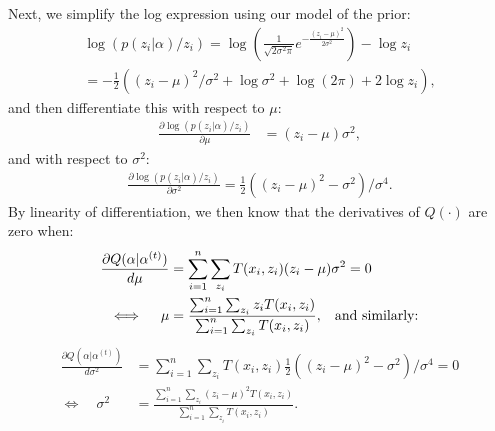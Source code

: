 \documentclass[10pt,letterpaper]{article}
\begin{document}
Next, we simplify the log expression using our model of the prior:  %
\begin{equation}
\begin{aligned}
\log \left( p(z_i | \alpha) / z_i \right) = \log \left( \frac{1}{\sqrt{2\sigma^2 \pi}} e^{-\frac{(z_i - \mu)^2}{2\sigma^2}} \right) - \log z_i \\
= -\frac{1}{2} \left( (z_i - \mu)^2 / \sigma^2 + \log \sigma^2 + \log \left( 2\pi \right) + 2 \log z_i \right) ,
\end{aligned}
\end{equation}
and then differentiate this with respect to $\mu$:
\begin{equation}
\begin{aligned}
\frac{\partial \log \left( p(z_i | \alpha) / z_i \right)}{\partial \mu} &= (z_i - \mu)\sigma^2 ,
\end{aligned}
\end{equation}
and with respect to $\sigma^2$:
\begin{equation}
\begin{aligned}
\frac{\partial \log \left( p(z_i | \alpha) / z_i \right)}{\partial \sigma^2} %
= \frac{1}{2}\left((z_i - \mu)^2 - \sigma^2 \right)/\sigma^4 .
\end{aligned}
\end{equation}
By linearity of differentiation, we then know that the derivatives of $Q(\cdot)$ are zero when:
\begin{equation}
\begin{aligned}
\frac{\partial Q(\alpha | \alpha^{(t)})}{d \mu} &= \sum_{i=1}^n \sum_{z_i} T(x_i, z_i) (z_i - \mu)\sigma^2 = 0  \\
\iff \quad \mu &= \frac{\sum_{i=1}^n \sum_{z_i} z_i T(x_i, z_i)}{\sum_{i=1}^n \sum_{z_i} T(x_i, z_i)} ,  \hspace{0.3cm}\text{and similarly:}
\end{aligned}
\end{equation}
\begin{equation}
\begin{aligned}
\frac{\partial Q(\alpha | \alpha^{(t)})}{d \sigma^2} &= \sum_{i=1}^n \sum_{z_i} T(x_i, z_i) \frac{1}{2}\left((z_i - \mu)^2 - \sigma^2 \right)/\sigma^4 = 0  \\
\iff \quad \sigma^2 &= \frac{\sum_{i=1}^n \sum_{z_i} (z_i - \mu)^2 T(x_i, z_i)}{\sum_{i=1}^n \sum_{z_i} T(x_i, z_i)} .
\end{aligned}
\end{equation}
\end{document}

